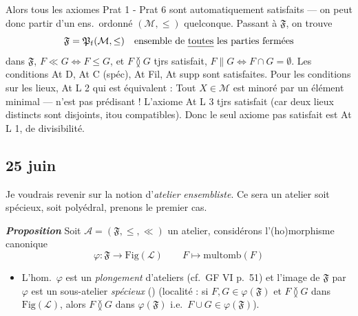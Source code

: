 \documentclass[11pt,a4paper]{article}
\begin{document}
Alors tous les axiomes Prat 1 - Prat 6 sont automatiquement satisfaits — on peut donc partir d'un ens.\ ordonné $(\mathcal{M}, \leq)$ quelconque. Passant à $\mathfrak{F}$, on trouve \struck{\ill{}}
\[
  \mathfrak{F} = \mathfrak{P}_{\mathrm{f}}(\mathcal{M}, \leq) \quad \text{ensemble de \emph{toutes} les parties fermées}
\]
dans $\mathfrak{F}$, $F \ll G \iff F \leq G$, et $F \between G$ tjrs satisfait, $F \parallel G \iff F \cap G = \emptyset$.  Les conditions At D, At C (spéc), At Fil, At supp sont satisfaites. Pour les conditions sur les lieux, At L 2  qui est équivalent : Tout \struck{\ill{}} $X \in \mathcal{M}$ est minoré par un élément minimal — n'est pas prédisant ! L'axiome At L 3 tjrs satisfait (car deux lieux distincts sont disjoints, itou compatibles). Donc le seul axiome pas satisfait est At L 1, de divisibilité.

\subsection{25 juin}

Je voudrais revenir sur la notion d'\emph{atelier} \emph{ensembliste}. Ce sera un atelier soit spécieux, soit polyédral, prenons le premier cas.

\textbf{\emph{Proposition}} Soit $\mathcal{A} = (\mathfrak{F}, \leq, \ll)$ un atelier, considérons l'(ho)morphisme canonique
\[
  \varphi : \mathfrak{F} \longrightarrow \mathrm{Fig}(\mathcal{L}) \qquad F \longmapsto \mathrm{multomb}(F)
\]
 
\begin{itemize}
  \item[(i)] L'hom.\ $\varphi$ est un \emph{plongement} d'ateliers (cf.\ GF VI p.~51) et l'image de $\mathfrak{F}$ par $\varphi$ est un sous-atelier \emph{spécieux} () (localité : si $F, G \in \varphi(\mathfrak{F})$ et $F \between G$ dans $\mathrm{Fig}(\mathcal{L})$, alors $F \between G$ dans $\varphi(\mathfrak{F})$ i.e.\ $F \cup G \in \varphi(\mathfrak{F})$).
\end{itemize}
\end{document}
